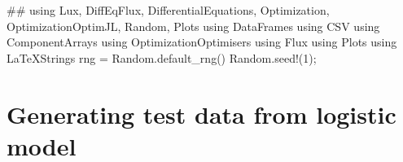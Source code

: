 \documentclass[
  letterpaper,
  DIV=11,
  numbers=noendperiod]{scrreport}
\newenvironment{Shaded}{\begin{snugshade}}{\end{snugshade}}
\newcommand{\BuiltInTok}[1]{\textcolor[rgb]{0.00,0.23,0.31}{#1}}
\newcommand{\CommentTok}[1]{\textcolor[rgb]{0.37,0.37,0.37}{#1}}
\newcommand{\FloatTok}[1]{\textcolor[rgb]{0.68,0.00,0.00}{#1}}
\newcommand{\FunctionTok}[1]{\textcolor[rgb]{0.28,0.35,0.67}{#1}}
\newcommand{\ImportTok}[1]{\textcolor[rgb]{0.00,0.46,0.62}{#1}}
\newcommand{\NormalTok}[1]{\textcolor[rgb]{0.00,0.23,0.31}{#1}}
\newcommand{\OperatorTok}[1]{\textcolor[rgb]{0.37,0.37,0.37}{#1}}
\begin{document}
\begin{Shaded}
\begin{Highlighting}[]
\CommentTok{\#\#}
\ImportTok{using} \BuiltInTok{Lux}\NormalTok{, }\BuiltInTok{DiffEqFlux}\NormalTok{, }\BuiltInTok{DifferentialEquations}\NormalTok{, }\BuiltInTok{Optimization}\NormalTok{, }\BuiltInTok{OptimizationOptimJL}\NormalTok{, }\BuiltInTok{Random}\NormalTok{, }\BuiltInTok{Plots}
\ImportTok{using} \BuiltInTok{DataFrames}
\ImportTok{using} \BuiltInTok{CSV}
\ImportTok{using} \BuiltInTok{ComponentArrays}
\ImportTok{using} \BuiltInTok{OptimizationOptimisers}
\ImportTok{using} \BuiltInTok{Flux}
\ImportTok{using} \BuiltInTok{Plots}
\ImportTok{using} \BuiltInTok{LaTeXStrings}
\NormalTok{rng }\OperatorTok{=} \BuiltInTok{Random}\NormalTok{.}\FunctionTok{default\_rng}\NormalTok{()}
\BuiltInTok{Random}\NormalTok{.}\FunctionTok{seed!}\NormalTok{(}\FloatTok{1}\NormalTok{);}
\end{Highlighting}
\end{Shaded}

\section{Generating test data from logistic
model}\label{generating-test-data-from-logistic-model}
\end{document}
